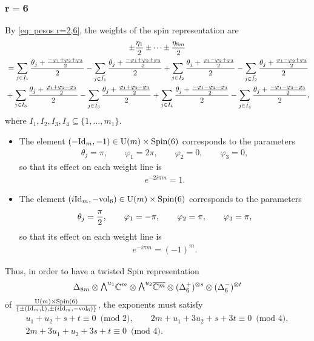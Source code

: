\documentclass[pdftex]{sigma}
\newcommand{\ext}{\raise1pt\hbox{$\textstyle\bigwedge$}}
\numberwithin{equation}{section}
\begin{document}
\subsubsection[$r=6$]{$\boldsymbol{r=6}$}

By \eqref{eq: pesos r=2,6}, the weights of the spin representation are
\begin{gather*}
 \pm {\eta_1\over 2} \pm \cdots \pm {\eta_{8m}\over 2}\\
 {} = \sum_{j\in I_1} {\theta_{j}+{-\varphi_1+\varphi_2+\varphi_3\over 2}\over 2} - \sum_{j\in \bar{I_1}} {\theta_{j}+{-\varphi_1+\varphi_2+\varphi_3\over 2}\over 2}
 + \sum_{j\in I_2} {\theta_{j}+{\varphi_1-\varphi_2+\varphi_3\over 2}\over 2} - \sum_{j\in \bar{I_2}} {\theta_{j}+{\varphi_1-\varphi_2+\varphi_3\over 2}\over 2} \\
{} + \sum_{j\in I_3} {\theta_{j}+{\varphi_1+\varphi_2-\varphi_3\over 2}\over 2} - \sum_{j\in \bar{I_3}} {\theta_{j}+{\varphi_1+\varphi_2-\varphi_3\over 2}\over 2}
 + \sum_{j\in I_4} {\theta_{j}+{-\varphi_1-\varphi_2-\varphi_3\over 2}\over 2} - \sum_{j\in \bar{I_4}} {\theta_{j}+{-\varphi_1-\varphi_2-\varphi_3\over 2}\over 2} ,
\end{gather*}
where $I_1,I_2, I_3,I_4\subseteq \{1,\dots,m_1\}$.

\begin{itemize}\itemsep=0pt
\item The element $(-{\rm Id}_{m},-1)\in {\rm U}(m)\times {\rm Spin}(6)$ corresponds to the parameters
\begin{gather*}
 \theta_{j} = \pi , \qquad \varphi_1 = 2\pi,\qquad \varphi_2 = 0,\qquad \varphi_3 = 0,
\end{gather*}
so that its ef\/fect on each weight line is
\begin{gather*}e^{-2i\pi m} = 1.
\end{gather*}

\item The element $(i{\rm Id}_m,-{\rm vol}_6)\in {\rm U}(m)\times {\rm Spin}(6)$ corresponds to the parameters
\begin{gather*}
 \theta_{j} = {\pi\over 2} , \qquad \varphi_1 = -\pi,\qquad \varphi_2 = \pi, \qquad \varphi_3 = \pi,
\end{gather*}
so that its ef\/fect on each weight line is
\begin{gather*}e^{-i\pi m} = (-1)^{m}.
\end{gather*}

\end{itemize}
Thus, in order to have a twisted Spin representation
\begin{gather*}\Delta_{8m}\otimes \ext^{u_1} \mathbb{C}^{m}\otimes \ext^{u_2} \overline{\mathbb{C}^{m}}\otimes (\Delta_6^+)^{\otimes s}\otimes (\Delta_6^-)^{\otimes t}\end{gather*}
of ${{\rm U}(m) \times {\rm Spin}(6)\over \{\pm ({\rm Id}_{m},1),\pm (i{\rm Id}_{m},-{\rm vol}_6)\}}$, the exponents must satisfy
\begin{gather*}
 u_1+u_2+s+t \equiv 0 \,\,\,\mbox{(mod 2)},\qquad
 2m+u_1+3u_2+s+3t \equiv 0 \,\,\,\mbox{(mod 4)},\\
 2m+3u_1+u_2+3s+t \equiv 0 \,\,\,\mbox{(mod 4)}.
\end{gather*}
\end{document}
